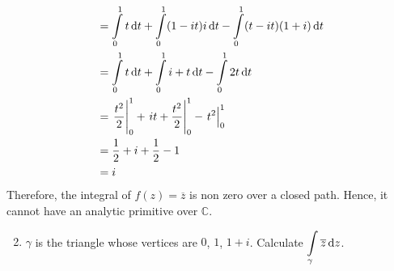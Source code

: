 \documentclass[fleqn, a4paper, 11pt, oneside]{amsart}
\theoremstyle{definition}
\theoremstyle{theorem}
\begin{document}
\begin{solution}
\begin{enumerate}[leftmargin=*]
\begin{align*}
                                                                         & = \int\limits_{0}^{1} t \dif t + \int\limits_{0}^{1} (1 - i t) i \dif t - \int\limits_{0}^{1} (t - i t) (1 + i) \dif t                                                            \\
                                                                         & = \int\limits_{0}^{1} t \dif t + \int\limits_{0}^{1} i + t \dif t - \int\limits_{0}^{1} 2 t \dif t                                                                                \\
                                                                         & = \left. \frac{t^2}{2} \right|_{0}^{1} + \left. i t + \frac{t^2}{2} \right|_{0}^{1} - \left. t^2 \right|_{0}^{1}                                                                  \\
                                                                         & = \frac{1}{2} + i + \frac{1}{2} - 1                                                                                                                                               \\
                                                                         & = i
			\end{align*}
			Therefore, the integral of $f(z) = \overline{z}$ is non zero over a closed path.
			Hence, it cannot have an analytic primitive over $\mathbb{C}$.
	\end{enumerate}
\end{solution}

\setcounter{question}{5}
\begin{question}
	\begin{enumerate}
		\setcounter{enumi}{1}
		\item
			$\gamma$ is the triangle whose vertices are $0$, $1$, $1 + i$.
			Calculate $\displaystyle \int\limits_{\gamma} \overline{z} \dif z$.
	\end{enumerate}
\end{question}
\end{document}
